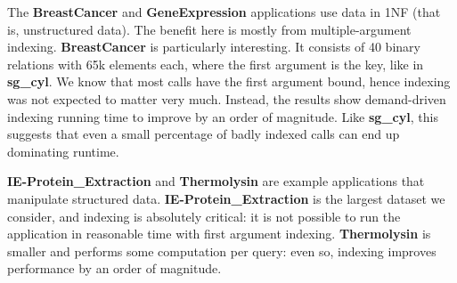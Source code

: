 \documentclass{llncs}
\newcommand{\JITI}{demand-driven indexing\xspace}
\newcommand{\bench}[1]{\textbf{\textsf{#1}}}
\newcommand{\sgCyl}{\bench{sg\_cyl}\xspace}
\newcommand{\BreastCancer}{\bench{BreastCancer}\xspace}
\newcommand{\GeneExpression}{\bench{GeneExpression}\xspace}
\newcommand{\IEProtein}{\bench{IE-Protein\_Extraction}\xspace}
\newcommand{\Thermolysin}{\bench{Thermolysin}\xspace}
\begin{document}
The \BreastCancer and \GeneExpression applications use data in 
1NF (that is, unstructured data). The benefit here is mostly from
multiple-argument indexing. \BreastCancer is particularly
interesting. It consists of 40 binary relations with 65k elements
each, where the first argument is the key, like in \sgCyl. We know
that most calls have the first argument bound, hence indexing was not
expected to matter very much. Instead, the results show \JITI running
time to improve by an order of magnitude. Like \sgCyl, this
suggests that even a small percentage of badly indexed calls can end
up dominating runtime.

\IEProtein and \Thermolysin are example
applications that manipulate structured data.
\IEProtein is the largest dataset we consider,
and indexing is absolutely critical: it is not possible to run the
application in reasonable time with first argument
indexing. \Thermolysin is smaller and performs some
computation per query: even so, indexing improves performance by an
order of magnitude.
\end{document}
